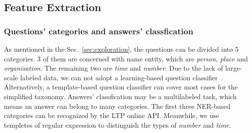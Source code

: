 \documentclass{llncs}
\begin{document}



\subsection{Feature Extraction}
\label{sec:feature}

\subsubsection{Questions' categories and answers' classfication}
\label{sec:categories}
As mentioned in the Sec.~\ref{sec:exploration}, 
the questions can be divided into 5 categories. 3 of them are concerned with name entity, which are \emph{person}, \emph{place} and \emph{organization}. The  remaining two are \emph{time} and \emph{number}. Due to the lack of large-scale labeled data, we can not adopt a learning-based question classifier~\cite{Li2003Learning}. Alternatively, a template-based question classifier can cover most cases for the simplified taxonomy. 
Answers' classfication may be a multilabeled task, which means an answer can belong to many categories. The first three NER-based categories can be recognized by the LTP online API. Meanwhile, we use templetes  of regular expression to distinguish the types of \emph{number} and \emph{time}. 
\end{document}
